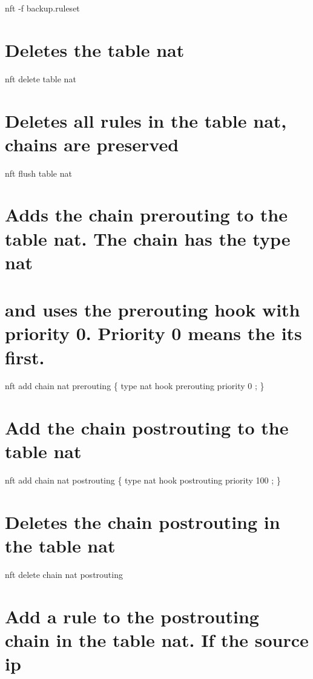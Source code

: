 \begin{itemize}
  nft -f backup.ruleset

  \section{Deletes the table nat}\label{deletes-the-table-nat}

  nft delete table nat

  \section{Deletes all rules in the table nat, chains are
  preserved}\label{deletes-all-rules-in-the-table-nat-chains-are-preserved}

  nft flush table nat

  \section{Adds the chain prerouting to the table nat. The chain has the
  type
  nat}\label{adds-the-chain-prerouting-to-the-table-nat.-the-chain-has-the-type-nat}

  \section{and uses the prerouting hook with priority 0. Priority 0
  means the its
  first.}\label{and-uses-the-prerouting-hook-with-priority-0.-priority-0-means-the-its-first.}

  nft add chain nat prerouting \{ type nat hook prerouting priority 0 ;
  \}

  \section{Add the chain postrouting to the table
  nat}\label{add-the-chain-postrouting-to-the-table-nat}

  nft add chain nat postrouting \{ type nat hook postrouting priority
  100 ; \}

  \section{Deletes the chain postrouting in the table
  nat}\label{deletes-the-chain-postrouting-in-the-table-nat}

  nft delete chain nat postrouting

  \section{Add a rule to the postrouting chain in the table nat. If the
  source
  ip}\label{add-a-rule-to-the-postrouting-chain-in-the-table-nat.-if-the-source-ip}


\end{itemize}
